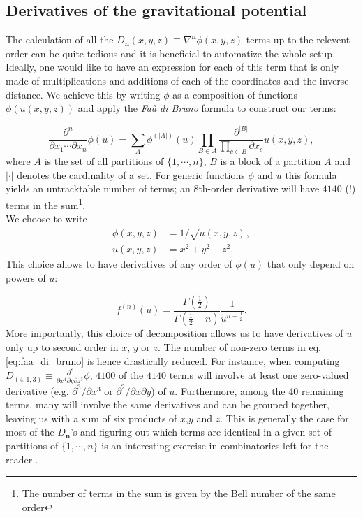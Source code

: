 \subsection{Derivatives of the gravitational potential}

The calculation of all the
$D_\mathbf{n}(x,y,z) \equiv \nabla^{\mathbf{n}}\phi(x,y,z)$ terms up
to the relevent order can be quite tedious and it is beneficial to
automatize the whole setup. Ideally, one would like to have an
expression for each of this term that is only made of multiplications
and additions of each of the coordinates and the inverse distance. We
achieve this by writing $\phi$ as a composition of functions
$\phi(u(x,y,z))$ and apply the \textit{Fa\`a di Bruno}
formula \citep[i.e. the ``chain rule'' for higher order derivatives,
e.g.][]{Hardy2006} to construct our terms:

\begin{equation}
\label{eq:faa_di_bruno}
\frac{\partial^n}{\partial x_1 \cdots \partial x_n} \phi(u)
= \sum_{A} \phi^{(|A|)}(u) \prod_{B \in
A} \frac{\partial^{|B|}}{\prod_{c\in B}\partial x_c} u(x,y,z),
\end{equation}
where $A$ is the set of all partitions of $\lbrace1,\cdots, n\rbrace$,
$B$ is a block of a partition $A$ and $|\cdot|$ denotes the
cardinality of a set. For generic functions $\phi$ and $u$ this
formula yields an untracktable number of terms; an 8th-order
derivative will have $4140$ (!)  terms in the sum\footnote{The number
of terms in the sum is given by the Bell number of the same order}. \\
We choose to write
\begin{align}
   \phi(x,y,z) &= 1 / \sqrt{u(x,y,z)}, \\
   u(x,y,z) &= x^2 + y^2 + z^2.
\end{align}
This choice allows to have derivatives of any order of $\phi(u)$ that
only depend on powers of $u$:

\begin{equation}
f^{(n)}(u) = \frac{\Gamma(\frac{1}{2})}{\Gamma(\frac{1}{2} -
n)}\frac{1}{u^{n+\frac{1}{2}}}.
\end{equation}
More importantly, this choice of decomposition allows us to have
derivatives of $u$ only up to second order in $x$, $y$ or $z$. The
number of non-zero terms in eq. \ref{eq:faa_di_bruno} is hence
drastically reduced. For instance, when computing
$D_{(4,1,3)} \equiv \frac{\partial^8}{\partial x^4 \partial y \partial
z^3} \phi$, $4100$ of the $4140$ terms will involve at least one
zero-valued derivative (e.g. $\partial^3/\partial x^3$ or
$\partial^2/\partial x\partial y$) of $u$. Furthermore, among the 40
remaining terms, many will involve the same derivatives and can be
grouped together, leaving us with a sum of six products of $x$,$y$ and
$z$. This is generally the case for most of the $D_\mathbf{n}$'s and
figuring out which terms are identical in a given set of partitions of
$\lbrace1,\cdots, n\rbrace$ is an interesting exercise in
combinatorics left for the reader \citep[see also][]{Hardy2006}.

